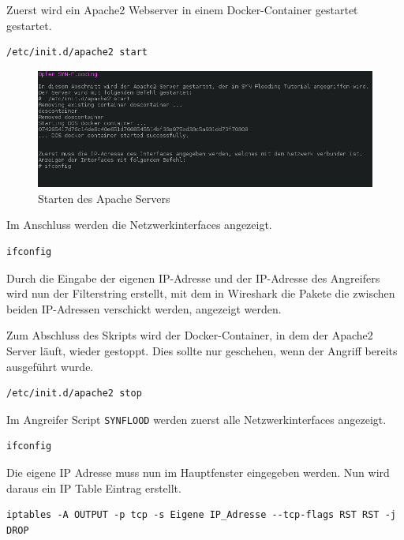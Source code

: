 Zuerst wird ein Apache2 Webserver in einem Docker-Container gestartet gestartet.
\begin{lstlisting}
/etc/init.d/apache2 start
\end{lstlisting}
	\begin{figure}[H]
		\centering
		\includegraphics[width=\textwidth]{images/dos/dos_syn_opfer_server_start.png}
		\caption{Starten des Apache Servers}
		\label{fig:start opfer apache}
	\end{figure}

Im Anschluss werden die Netzwerkinterfaces angezeigt.
\begin{lstlisting}
ifconfig
\end{lstlisting}

Durch die Eingabe der eigenen IP-Adresse und der IP-Adresse des Angreifers wird nun der Filterstring erstellt, mit dem in Wireshark die Pakete die zwischen beiden IP-Adressen verschickt werden, angezeigt werden.

Zum Abschluss des Skripts wird der Docker-Container, in dem der Apache2 Server läuft, wieder gestoppt. Dies sollte nur geschehen, wenn der Angriff bereits ausgeführt wurde.
\begin{lstlisting}
/etc/init.d/apache2 stop
\end{lstlisting}

\newpage Im Angreifer Script  \colorbox{altgray}{\lstinline|SYNFLOOD|} werden zuerst alle Netzwerkinterfaces angezeigt.
\begin{lstlisting}
ifconfig
\end{lstlisting}
Die eigene IP Adresse muss nun im Hauptfenster eingegeben werden. 
Nun wird daraus ein IP Table Eintrag erstellt.
\begin{lstlisting}
iptables -A OUTPUT -p tcp -s Eigene IP_Adresse --tcp-flags RST RST -j DROP
\end{lstlisting}

